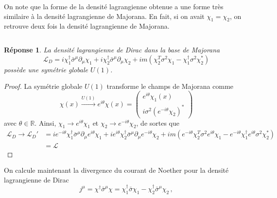 \documentclass{article}
\numberwithin{equation}{section}
\theoremstyle{solution}
\newtheorem{solution}{Réponse}[section]
\begin{document}
On note que la forme de la densité lagrangienne obtenue a une forme très similaire à la densité lagrangienne de Majorana. En fait, 
si on avait $\chi_1 = \chi_2$, on retrouve deux fois la densité lagrangienne de Majorana.


\subsection{}
\begin{solution}
La densité lagrangienne de Dirac dans la base de Majorana
\begin{equation}
        \mathcal{L}_D = 
        i \chi_1^{\dagger}\bar{\sigma}^{\mu}\partial_\mu \chi_1 + i\chi_2^{\dagger}\bar{\sigma}^{\mu}\partial_\mu \chi_2
       +
        im(\chi_2^{T} \sigma^{2} \chi_1 - \chi_1^{\dagger} \sigma^{2}\chi_2^{*})
\end{equation} 
possède une symétrie globale $U(1)$. 
\end{solution}
\begin{proof}
La symétrie globale $U(1)$ transforme le champs de Majorana comme
\begin{equation}
       \chi(x) \overset{U(1)}{\rightarrow } e^{i\theta}\chi(x) = 
       \begin{pmatrix}
               e^{i\theta}\chi_1(x) \\[1ex]
               i \sigma^{2}(e^{-i \theta} \chi_2)^{*}
       \end{pmatrix}
\end{equation} 
avec $\theta \in \mathbb{R}$. Ainsi, $\chi_1 \rightarrow  e^{i\theta}\chi_1$ et $\chi_2 \rightarrow e^{-i\theta}\chi_2$, de sortes que 
\begin{align*}
        \mathcal{L}_D \rightarrow \mathcal{L}_D' &= 
        i e^{-i\theta}\chi_1^{\dagger}\bar{\sigma}^{\mu}\partial_\mu e^{i\theta}\chi_1 + ie^{i\theta}\chi_2^{\dagger}\bar{\sigma}^{\mu}\partial_\mu e^{-i\theta}\chi_2
       +
        im(e^{-i\theta}\chi_2^{T} \sigma^{2} e^{i\theta}\chi_1 - e^{-i\theta}\chi_1^{\dagger} e^{i\theta}\sigma^{2}\chi_2^{*})\\
        &=  \mathcal{L}
\end{align*}
\end{proof}
On calcule maintenant la divergence du courant de Noether pour la densité lagrangienne de Dirac
\begin{equation}
        j^{\mu} = \chi^{\dagger} \bar{\sigma}^{\mu}\chi = \chi_1^{\dagger}\bar{\sigma}\chi_1 - \chi_2^{\dagger} \bar{\sigma}^{\mu} \chi_2\, ,
\end{equation} 
\end{document}
